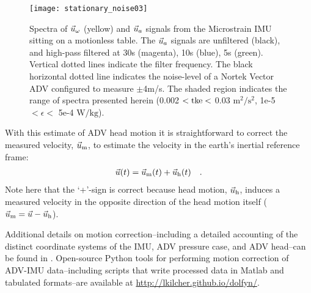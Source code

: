 \begin{figure}
  \centering
  \label{fig:stationary_noise}
  \texttt{[image: stationary\_noise03]}
  \caption{Spectra of $\vec{u}_\omega$ (yellow) and $\vec{u}_a$ signals from the Microstrain IMU sitting on a motionless table. The $\vec{u}_a$ signals are unfiltered (black), and high-pass filtered at 30s (magenta), 10s (blue), 5s (green). Vertical dotted lines indicate the filter frequency. The black horizontal dotted line indicates the noise-level of a Nortek Vector ADV configured to measure $\pm$4m/s. The shaded region indicates the range of spectra presented herein (0.002 $< \mathrm{tke} <$ 0.03 $\mathrm{m^2/s^2}$, 1e-5 $< \epsilon <$ 5e-4 $\mathrm{W/kg}$).}
\end{figure}

With this estimate of ADV head motion it is straightforward to correct the measured velocity, $\vec{u}_\mathrm{m}$, to estimate the velocity in the earth's inertial reference frame:
\begin{align}
  \label{eqn:u_mot_def}
  \vec{u}(t) & = \vec{u}_\mathrm{m}(t) + \vec{u}_\mathrm{h}(t) &  .
\end{align}
Note here that the `+'-sign is correct because head motion, $\vec{u}_\mathrm{h}$, induces a measured velocity in the opposite direction of the head motion itself ($\vec{u}_\mathrm{m} = \vec{u} - \vec{u}_\mathrm{h}$).

Additional details on motion correction--including a detailed accounting of the distinct coordinate systems of the IMU, ADV pressure case, and ADV head--can be found in \cite{Kilcher++2016}. Open-source Python tools for performing motion correction of ADV-IMU data--including scripts that write processed data in Matlab and tabulated formats--are available at \url{http://lkilcher.github.io/dolfyn/}.

